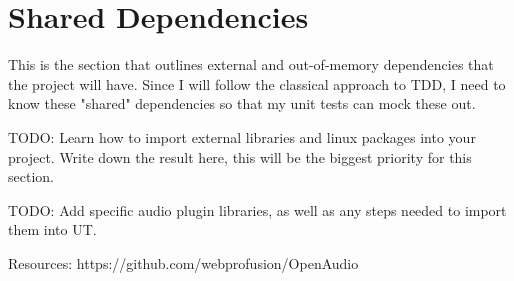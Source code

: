 \section{Shared Dependencies}

This is the section that outlines external and out-of-memory dependencies that the project will have. Since I will follow the classical approach to TDD, I need to know these "shared" dependencies so that my unit tests can mock these out.


TODO: Learn how to import external libraries and linux packages into your project. Write down the result here, this will be the biggest priority for this section.



TODO: Add specific audio plugin libraries, as well as any steps needed to import them into UT.




Resources:
https://github.com/webprofusion/OpenAudio